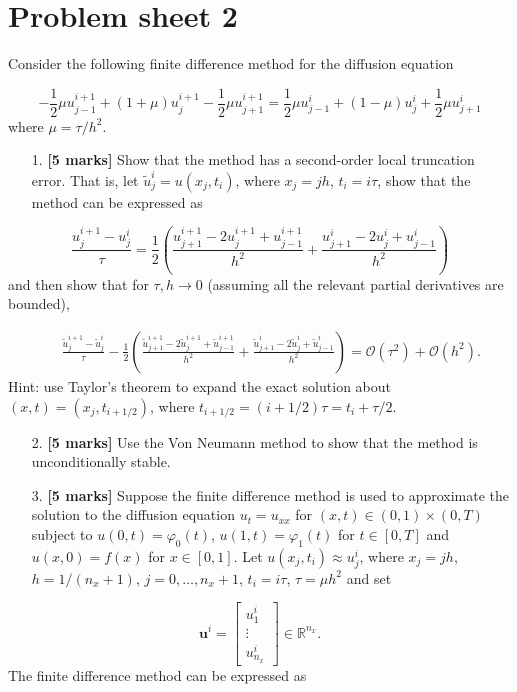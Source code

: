 \documentclass[12pt,a4paper]{article}
\begin{document}
\section{Problem sheet 2}
Consider the following finite difference method for the diffusion equation

\[
-\frac{1}{2}\mu u^{i+1}_{j-1} + (1 + \mu)u^{i+1}_j -\frac{1}{2}\mu u^{i+1}_{j+1} = 
\frac{1}{2}\mu u^{i}_{j-1} + (1 - \mu)u^{i}_j +\frac{1}{2}\mu u^{i}_{j+1} 
\]
where $\mu = \tau/h^2$.

\begin{itemize}
\item[1. ] \textbf{[5 marks]} Show that the method has a second-order local truncation error. That is, let $\tilde{u}^i_j = u(x_j,t_i)$, where $x_j = jh$, $t_i = i\tau$, show that the method can be expressed as

\end{itemize}
\[
\frac{u^{i+1}_j - u^i_j}{\tau} = \frac{1}{2}\left( \frac{u^{i+1}_{j+1} - 2u^{i+1}_{j} + u^{i+1}_{j-1}}{h^2} + \frac{u^{i}_{j+1} - 2u^{i}_{j} + u^{i}_{j-1}}{h^2}   \right)
\]
and then show that for $\tau, h \to 0$ (assuming all the relevant partial derivatives are bounded),


\begin{eqnarray*}
&& \frac{\tilde{u}^{i+1}_j - \tilde{u}^i_j}{\tau} - \frac{1}{2}\left( \frac{\tilde{u}^{i+1}_{j+1} - 2\tilde{u}^{i+1}_{j} + \tilde{u}^{i+1}_{j-1}}{h^2} + \frac{\tilde{u}^{i}_{j+1} - 2\tilde{u}^{i}_{j} + \tilde{u}^{i}_{j-1}}{h^2}   \right) = \mathcal{O}(\tau^2) + \mathcal{O}(h^2).
\end{eqnarray*}
Hint: use Taylor's theorem to expand the exact solution about $(x,t) = (x_j,t_{i+1/2})$, where $t_{i+1/2} = (i + 1/2)\tau = t_i + \tau/2$.

\begin{itemize}
\item[2. ] \textbf{[5 marks]} Use the Von Neumann method to show that the method is unconditionally stable.


\item[3. ] \textbf{[5 marks]} Suppose the finite difference method is used to approximate the solution to the diffusion equation $u_t = u_{xx}$ for $(x, t) \in (0,1) \times (0,T)$ subject to $u(0,t) = \varphi_0(t)$, $u(1,t) = \varphi_1(t)$ for $t \in [0, T]$ and $u(x,0) = f(x)$ for $x \in [0, 1]$.  Let $u(x_j,t_i) \approx u^i_j$, where $x_j = jh$, $h = 1/(n_x + 1)$, $j = 0, \ldots, n_x+1$, $t_i = i\tau$, $\tau = \mu h^2$ and set

\end{itemize}
\[
\mathbf{u}^i = \begin{bmatrix}
u^{i}_{1} \\
\vdots \\
u^{i}_{n_x}
\end{bmatrix} \in \mathbb{R}^{n_x}.
\]
The finite difference method can be expressed as
\end{document}
